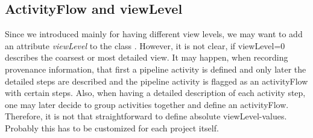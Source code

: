 
\subsection{ActivityFlow and viewLevel}
Since we introduced  mainly for having different view levels, 
we may want to add an attribute \emph{viewLevel} to the class .
However, it is not clear, if viewLevel=0 describes the coarsest or most detailed view.
It may happen, when recording provenance information, that first a pipeline activity 
is defined and only later the detailed steps are described and the pipeline activity is flagged as
an activityFlow with certain steps. Also, when having a detailed description of each activity step, 
one may later decide to group activities together and define an activityFlow. Therefore, it is not
that straightforward to define absolute viewLevel-values. Probably this has to be customized for
each project itself.

